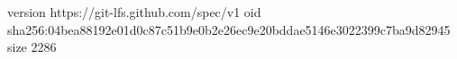 version https://git-lfs.github.com/spec/v1
oid sha256:04bea88192e01d0c87c51b9e0b2e26ec9e20bddae5146e3022399c7ba9d82945
size 2286
